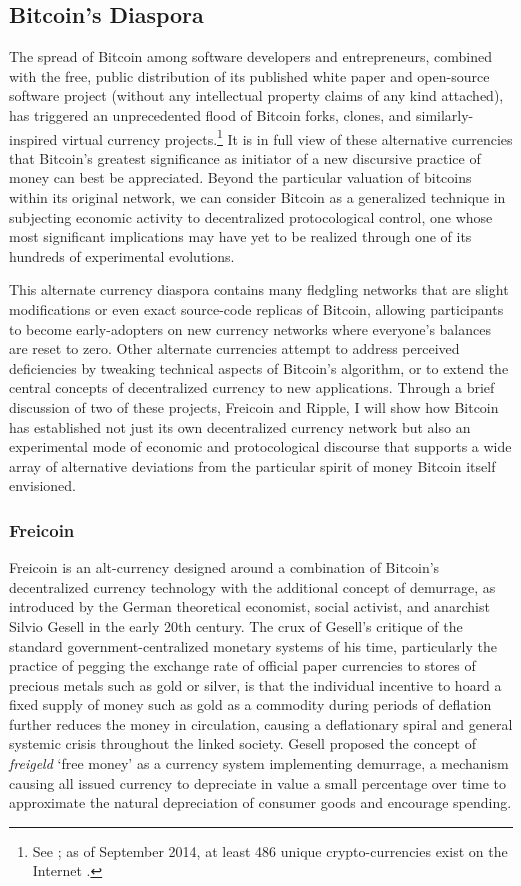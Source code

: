 \subsection*{Bitcoin's Diaspora}
The spread of Bitcoin among software developers and entrepreneurs, combined with the free, public distribution of its published white paper and open-source software project (without any intellectual property claims of any kind attached), has triggered an unprecedented flood of Bitcoin forks, clones, and similarly-inspired virtual currency projects.\footnote{
  See \autocite{Popper13}; as of September 2014, at least 486 unique crypto-currencies exist on the Internet \autocite{CoinMarketCap}.
}
It is in full view of these alternative currencies that Bitcoin's greatest significance as initiator of a new discursive practice of money can best be appreciated. Beyond the particular valuation of bitcoins within its original network, we can consider Bitcoin as a generalized technique in subjecting economic activity to decentralized protocological control, one whose most significant implications may have yet to be realized through one of its hundreds of experimental evolutions.

This alternate currency diaspora contains many fledgling networks that are slight modifications or even exact source-code replicas of Bitcoin, allowing participants to become early-adopters on new currency networks where everyone's balances are reset to zero. Other alternate currencies attempt to address perceived deficiencies by tweaking technical aspects of Bitcoin's algorithm, or to extend the central concepts of decentralized currency to new applications. Through a brief discussion of two of these projects, Freicoin and Ripple, I will show how Bitcoin has established not just its own decentralized currency network but also an experimental mode of economic and protocological discourse that supports a wide array of alternative deviations from the particular spirit of money Bitcoin itself envisioned.

\subsubsection*{Freicoin}
Freicoin is an alt-currency designed around a combination of Bitcoin's decentralized currency technology with the additional concept of demurrage, as introduced by the German theoretical economist, social activist, and anarchist Silvio Gesell in the early 20th century. The crux of Gesell's critique of the standard government-centralized monetary systems of his time, particularly the practice of pegging the exchange rate of official paper currencies to stores of precious metals such as gold or silver, is that the individual incentive to hoard a fixed supply of money such as gold as a commodity during periods of deflation further reduces the money in circulation, causing a deflationary spiral and general systemic crisis throughout the linked society. Gesell proposed the concept of \emph{freigeld} `free money' as a currency system implementing demurrage, a mechanism causing all issued currency to depreciate in value a small percentage over time to approximate the natural depreciation of consumer goods and encourage spending.

